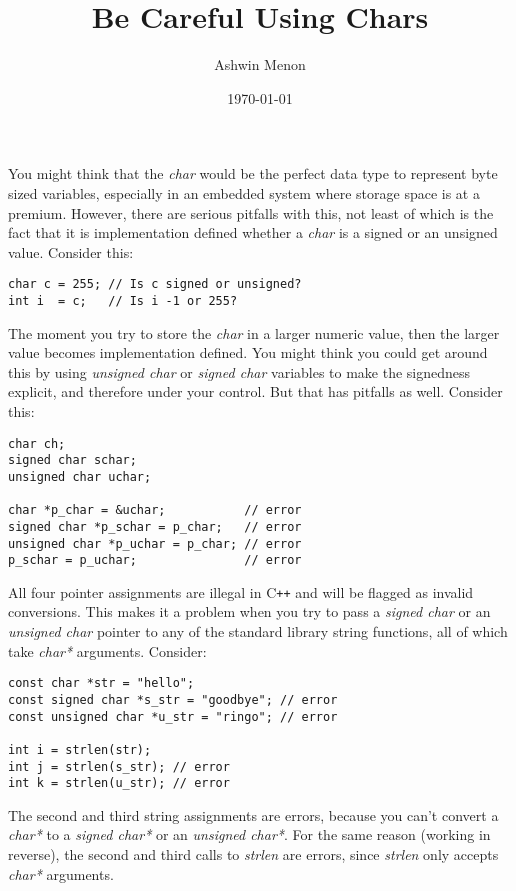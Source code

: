 \documentclass{article}
\begin{document}
\title{Be Careful Using Chars}
\author{Ashwin Menon}
\date{\today}
\maketitle

You might think that the \emph{char} would be the perfect data type to represent
byte sized variables, especially in an embedded system where storage space is at
a premium. However, there are serious pitfalls with this, not least of which is
the fact that it is implementation defined whether a \emph{char} is a signed or an
unsigned value. Consider this:

\begin{lstlisting}
char c = 255; // Is c signed or unsigned?
int i  = c;   // Is i -1 or 255?
\end{lstlisting}

The moment you try to store the \emph{char} in a larger numeric value, then the
larger value becomes implementation defined. You might think you could get around
this by using \emph{unsigned char} or \emph{signed char} variables to make the
signedness explicit, and therefore under your control. But that has pitfalls as 
well. Consider this:

\begin{lstlisting}
char ch;
signed char schar;
unsigned char uchar;

char *p_char = &uchar;           // error
signed char *p_schar = p_char;   // error
unsigned char *p_uchar = p_char; // error
p_schar = p_uchar;               // error
\end{lstlisting}

All four pointer assignments are illegal in C\texttt{++} and will be flagged as invalid
conversions. This makes it a problem when you try to pass a \emph{signed char}
or an \emph{unsigned char} pointer to any of the standard library string 
functions, all of which take \emph{char*} arguments. Consider:

\begin{lstlisting}
const char *str = "hello";
const signed char *s_str = "goodbye"; // error
const unsigned char *u_str = "ringo"; // error

int i = strlen(str);
int j = strlen(s_str); // error
int k = strlen(u_str); // error
\end{lstlisting}

The second and third string assignments are errors, because you can’t convert a
\emph{char*} to a \emph{signed char*} or an \emph{unsigned char*}. For the same
reason (working in reverse), the second and third calls to \emph{strlen} are
errors, since \emph{strlen} only accepts \emph{char*} arguments.
\end{document}

